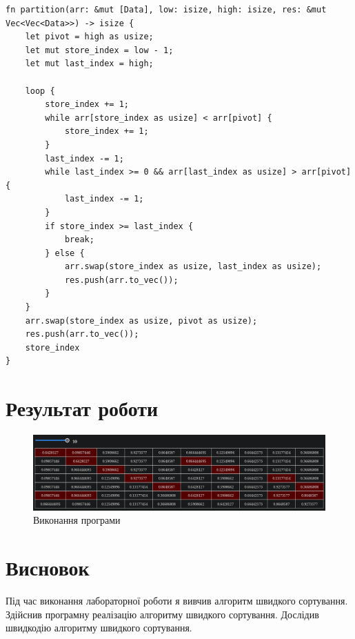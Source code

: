 \documentclass{article}
\begin{document}
\begin{normalsize}
\begin{lstlisting}
fn partition(arr: &mut [Data], low: isize, high: isize, res: &mut Vec<Vec<Data>>) -> isize {
	let pivot = high as usize;
	let mut store_index = low - 1;
	let mut last_index = high;
	
	loop {
		store_index += 1;
		while arr[store_index as usize] < arr[pivot] {
			store_index += 1;
		}
		last_index -= 1;
		while last_index >= 0 && arr[last_index as usize] > arr[pivot] {
			last_index -= 1;
		}
		if store_index >= last_index {
			break;
		} else {
			arr.swap(store_index as usize, last_index as usize);
			res.push(arr.to_vec());
		}
	}
	arr.swap(store_index as usize, pivot as usize);
	res.push(arr.to_vec());
	store_index
}

\end{lstlisting}
		
		\section*{Результат роботи}
		\begin{figure}[H]
			\centering
			\includegraphics[scale=0.36]{1}
			\caption{Виконання програми}
		\end{figure}
		
		\section*{Висновок}
		Під час виконання лабораторної роботи я вивчив алгоритм швидкого сортування. Здійснив програмну реалізацію алгоритму швидкого сортування. Дослідив швидкодію алгоритму швидкого сортування.
		
	\end{normalsize}
\end{document}
